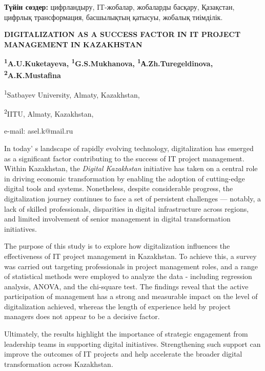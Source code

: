 {\bfseries Түйін сөздер:} цифрландыру, IT-жобалар, жобаларды басқару,
Қазақстан, цифрлық трансформация, басшылықтың қатысуы, жобалық
тиімділік.

\begin{articleheader}
{\bfseries DIGITALIZATION AS A SUCCESS FACTOR IN IT PROJECT MANAGEMENT IN KAZAKHSTAN}

{\bfseries
\textsuperscript{1}A.U.Kuketayeva\textsuperscript{\envelope },
\textsuperscript{1}G.S.Mukhanova,
\textsuperscript{1}А.Zh.Turegeldinova,
\textsuperscript{2}A.K.Mustafina
}
\end{articleheader}

\begin{affiliation}
\textsuperscript{1}Satbayev University, Almaty, Kazakhstan,

\textsuperscript{2}IITU, Almaty, Kazakhstan,

e-mail: asel.k@mail.ru
\end{affiliation}

In today' s landscape of rapidly evolving technology,
digitalization has emerged as a significant factor contributing to the
success of IT project management. Within Kazakhstan, the \emph{Digital
Kazakhstan} initiative has taken on a central role in driving economic
transformation by enabling the adoption of cutting-edge digital tools
and systems. Nonetheless, despite considerable progress, the
digitalization journey continues to face a set of persistent challenges
--- notably, a lack of skilled professionals, disparities in digital
infrastructure across regions, and limited involvement of senior
management in digital transformation initiatives.

The purpose of this study is to explore how digitalization influences
the effectiveness of IT project management in Kazakhstan. To achieve
this, a survey was carried out targeting professionals in project
management roles, and a range of statistical methods were employed to
analyze the data - including regression analysis, ANOVA, and the
chi-square test. The findings reveal that the active participation of
management has a strong and measurable impact on the level of
digitalization achieved, whereas the length of experience held by
project managers does not appear to be a decisive factor.

Ultimately, the results highlight the importance of strategic engagement
from leadership teams in suppor\-ting digital initiatives. Strengthening
such support can improve the outcomes of IT projects and help accelerate
the broader digital transformation across Kazakhstan.

